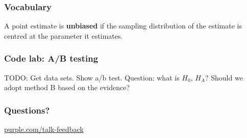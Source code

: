 \documentclass[t]{beamer}
\begin{document}
\begin{frame}
  \frametitle{Vocabulary}

  A point estimate is \textbf{unbiased} if the sampling distribution
  of the estimate is centred at the parameter it estimates.


\end{frame}

\begin{frame}
  \frametitle{Code lab: A/B testing}

  TODO: Get data sets.  Show a/b test.  Question: what is $H_0$,
  $H_A$?  Should we adopt method B based on the evidence?
\end{frame}

\begin{frame}
  \frametitle{Questions?}
  \vspace{3cm}
  \centerline{\large\url{purple.com/talk-feedback}}
\end{frame}

\end{document}
